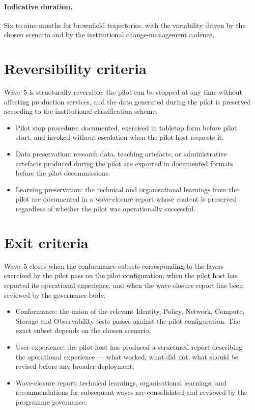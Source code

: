\paragraph{Indicative duration.} Six to nine months for brownfield
trajectories, with the variability driven by the chosen scenario
and by the institutional change-management cadence.

\section{Reversibility criteria}
\label{sec:w5-reversibility}

Wave~5 is structurally reversible: the pilot can be stopped at
any time without affecting production services, and the data
generated during the pilot is preserved according to the
institutional classification scheme.

\begin{itemize}[leftmargin=1.5em,nosep]
  \item Pilot stop procedure: documented, exercised in tabletop
    form before pilot start, and invoked without escalation when
    the pilot host requests it.
  \item Data preservation: research data, teaching artefacts, or
    administrative artefacts produced during the pilot are
    exported in documented formats before the pilot
    decommissions.
  \item Learning preservation: the technical and organisational
    learnings from the pilot are documented in a wave-closure
    report whose content is preserved regardless of whether the
    pilot was operationally successful.
\end{itemize}

\section{Exit criteria}
\label{sec:w5-exit}

Wave~5 closes when the conformance subsets corresponding to the
layers exercised by the pilot pass on the pilot configuration,
when the pilot host has reported its operational experience, and
when the wave-closure report has been reviewed by the governance
body.

\begin{itemize}[leftmargin=1.5em,nosep]
  \item Conformance: the union of the relevant Identity, Policy,
    Network, Compute, Storage and Observability tests passes
    against the pilot configuration. The exact subset depends on
    the chosen scenario.
  \item User experience: the pilot host has produced a structured
    report describing the operational experience --- what worked,
    what did not, what should be revised before any broader
    deployment.
  \item Wave-closure report: technical learnings, organisational
    learnings, and recommendations for subsequent waves are
    consolidated and reviewed by the programme governance.
\end{itemize}

